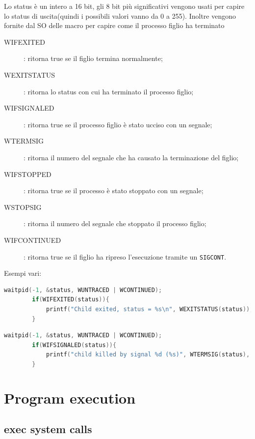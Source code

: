 \documentclass[a4paper, 12pt]{book}
\begin{document}
    Lo status è un intero a 16 bit, gli 8 bit più significativi vengono 
    usati per capire lo status di uscita(quindi i possibili valori vanno da 0 a 255).
    Inoltre vengono fornite dal SO delle macro per capire come il processo figlio ha 
    terminato 
    \begin{description}
        \item[WIFEXITED]: ritorna true se il figlio termina normalmente;
        \item[WEXITSTATUS]: ritorna lo status con cui ha terminato il processo figlio;
        \item[WIFSIGNALED]: ritorna true se il processo figlio è stato ucciso con un segnale;
        \item[WTERMSIG]: ritorna il numero del segnale che ha causato la terminazione del figlio;
        \item[WIFSTOPPED]:   ritorna true se il processo è stato stoppato con un segnale;
        \item[WSTOPSIG]: ritorna il numero del segnale che stoppato il processo figlio;
        \item[WIFCONTINUED]: ritorna true se il figlio ha ripreso l'esecuzione tramite un \verb|SIGCONT|.         
    \end{description}
    Esempi vari:
    \begin{lstlisting}[language=C]
        waitpid(-1, &status, WUNTRACED | WCONTINUED);
        if(WIFEXITED(status)){
            printf("Child exited, status = %s\n", WEXITSTATUS(status));
        }
    \end{lstlisting}
    \begin{lstlisting}[language=C]
        waitpid(-1, &status, WUNTRACED | WCONTINUED);
        if(WIFSIGNALED(status)){
            printf("child killed by signal %d (%s)", WTERMSIG(status), strsignal(WTERMSIG(status)));
        }
    \end{lstlisting}

    \section{Program execution}

    \subsection{exec system calls}
\end{document}
